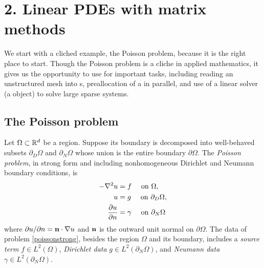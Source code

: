 
\chapter{2. Linear PDEs with matrix methods}

We start with a cliched example, the Poisson problem, because it is the right place to start.  Though the Poisson problem is a cliche in applied mathematics, it gives us the opportunity to use \PETSc for important tasks, including reading an unstructured mesh into \PETSc \pVec s, preallocation of a \pMat in parallel, and use of a linear solver (a \pKSP object) to solve large sparse systems.

\section{The Poisson problem}

Let $\Omega \subset \mathbb{R}^d$ be a region.  Suppose its boundary is decomposed into well-behaved subsets $\partial_D \Omega$ and $\partial_N \Omega$ whose union is the entire boundary $\partial \Omega$.  The \emph{Poisson problem}, in strong form and including nonhomogeneous Dirichlet and Neumann boundary conditions, is
\begin{align}
- \nabla^2 u &= f \quad \text{ on } \Omega, \label{poissonstrong} \\
u &= g \quad \text{ on } \partial_D \Omega, \notag \\
\frac{\partial u}{\partial n} &= \gamma \quad \text{ on } \partial_N \Omega \notag
\end{align}
where $\partial u/\partial n = \mathbf{n} \cdot \nabla u$ and $\mathbf{n}$ is the outward unit normal on $\partial \Omega$.  The data of problem \eqref{poissonstrong}, besides the region $\Omega$ and its boundary, includes a \emph{source term} $f\in L^2(\Omega)$, \emph{Dirichlet data} $g\in L^2(\partial_N \Omega)$, and \emph{Neumann data} $\gamma\in L^2(\partial_N \Omega)$.

